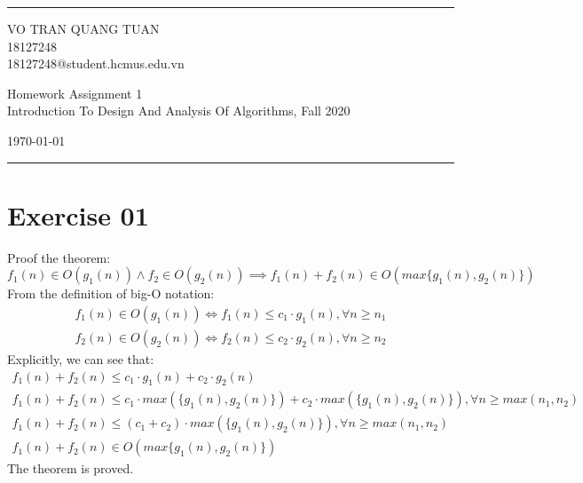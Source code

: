 \documentclass[a4paper]{article}
\begin{document}

\fancyhead[C]{}
\hrule \medskip %
\begin{minipage}{0.295\textwidth} 
\raggedright
\footnotesize
VO TRAN QUANG TUAN \hfill\\   
18127248\hfill\\
18127248@student.hcmus.edu.vn
\end{minipage}
\begin{minipage}{0.4\textwidth} 
\centering 
\large 
Homework Assignment 1\\ 
\normalsize 
Introduction To Design And Analysis Of Algorithms, Fall 2020\\ 
\end{minipage}
\begin{minipage}{0.295\textwidth} 
\raggedleft
\today\hfill\\
\end{minipage}
\medskip\hrule 
\bigskip


\tableofcontents
\newpage
\section{Exercise 01}

Proof the theorem:
\begin{equation*}
    f_1(n)\in O(g_1(n)) \wedge f_2\in O(g_2(n)) \implies f_1(n) + f_2(n) \in O(max\{g_1(n), g_2(n)\})
\end{equation*}
From the definition of big-O notation:
\begin{align*}
    f_1(n) \in O(g_1(n)) \Longleftrightarrow f_1(n) \leq c_1\cdot g_1(n), \forall n \geq n_1 \\
    f_2(n) \in O(g_2(n)) \Longleftrightarrow f_2(n) \leq c_2\cdot g_2(n),
    \forall n \geq n_2
\end{align*}
Explicitly, we can see that:
\begin{gather*}
    f_1(n) + f_2(n) \leq c_1\cdot g_1(n) + c_2\cdot g_2(n) \\ 
    f_1(n) + f_2(n) \leq c_1 \cdot max(\{g_1(n), g_2(n)\}) + c_2 \cdot max(\{g_1(n), g_2(n)\}), \forall n \geq max(n_1, n_2) \\
    f_1(n) + f_2(n) \leq (c_1 + c_2) \cdot max(\{g_1(n), g_2(n)\}), \forall n \geq max(n_1, n_2) \\
    f_1(n) + f_2(n) \in O(max\{g_1(n), g_2(n)\})
\end{gather*}
The theorem is proved.
\newpage
\end{document}
